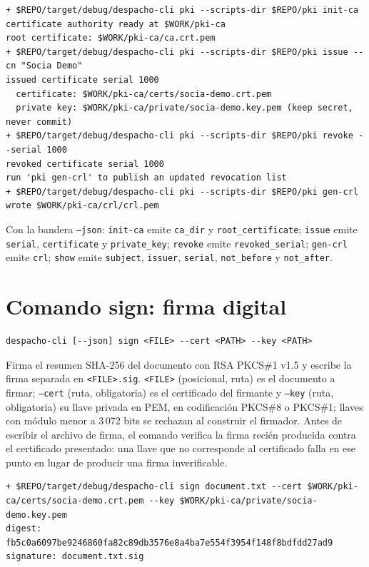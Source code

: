 \begin{lstlisting}[numbers=none]
+ $REPO/target/debug/despacho-cli pki --scripts-dir $REPO/pki init-ca
certificate authority ready at $WORK/pki-ca
root certificate: $WORK/pki-ca/ca.crt.pem
+ $REPO/target/debug/despacho-cli pki --scripts-dir $REPO/pki issue --cn "Socia Demo"
issued certificate serial 1000
  certificate: $WORK/pki-ca/certs/socia-demo.crt.pem
  private key: $WORK/pki-ca/private/socia-demo.key.pem (keep secret, never commit)
+ $REPO/target/debug/despacho-cli pki --scripts-dir $REPO/pki revoke --serial 1000
revoked certificate serial 1000
run 'pki gen-crl' to publish an updated revocation list
+ $REPO/target/debug/despacho-cli pki --scripts-dir $REPO/pki gen-crl
wrote $WORK/pki-ca/crl/crl.pem
\end{lstlisting}

Con la bandera \texttt{--json}: \texttt{init-ca} emite \texttt{ca\_dir} y \texttt{root\_certificate}; \texttt{issue} emite \texttt{serial}, \texttt{certificate} y \texttt{private\_key}; \texttt{revoke} emite \texttt{revoked\_serial}; \texttt{gen-crl} emite \texttt{crl}; \texttt{show} emite \texttt{subject}, \texttt{issuer}, \texttt{serial}, \texttt{not\_before} y \texttt{not\_after}.



\section{Comando sign: firma digital}\label{sec:cli-sign}

\begin{lstlisting}[numbers=none]
despacho-cli [--json] sign <FILE> --cert <PATH> --key <PATH>
\end{lstlisting}

Firma el resumen SHA-256 del documento con RSA PKCS\#1 v1.5 y escribe la firma separada en \texttt{<FILE>.sig}. \texttt{<FILE>} (posicional, ruta) es el documento a firmar; \texttt{--cert} (ruta, obligatoria) es el certificado del firmante y \texttt{--key} (ruta, obligatoria) su llave privada en PEM, en codificación PKCS\#8 o PKCS\#1; llaves con módulo menor a 3\,072 bits se rechazan al construir el firmador. Antes de escribir el archivo de firma, el comando verifica la firma recién producida contra el certificado presentado: una llave que no corresponde al certificado falla en ese punto en lugar de producir una firma inverificable.

\begin{lstlisting}[numbers=none]
+ $REPO/target/debug/despacho-cli sign document.txt --cert $WORK/pki-ca/certs/socia-demo.crt.pem --key $WORK/pki-ca/private/socia-demo.key.pem
digest: fb5c0a6097be9246860fa82c89db3576e8a4ba7e554f3954f148f8bdfdd27ad9
signature: document.txt.sig
\end{lstlisting}

